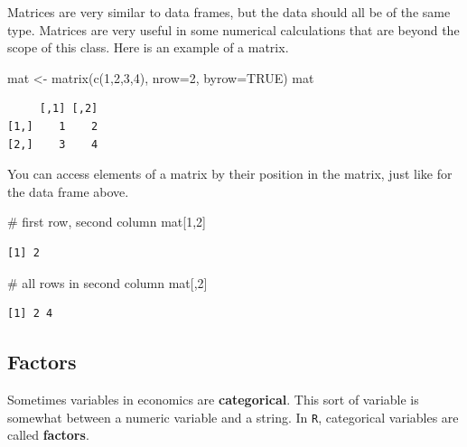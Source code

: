 \documentclass[
  letterpaper,
  DIV=11,
  numbers=noendperiod]{scrreprt}
\newenvironment{Shaded}{\begin{snugshade}}{\end{snugshade}}
\newcommand{\AttributeTok}[1]{\textcolor[rgb]{0.40,0.45,0.13}{#1}}
\newcommand{\CommentTok}[1]{\textcolor[rgb]{0.37,0.37,0.37}{#1}}
\newcommand{\ConstantTok}[1]{\textcolor[rgb]{0.56,0.35,0.01}{#1}}
\newcommand{\DecValTok}[1]{\textcolor[rgb]{0.68,0.00,0.00}{#1}}
\newcommand{\FunctionTok}[1]{\textcolor[rgb]{0.28,0.35,0.67}{#1}}
\newcommand{\NormalTok}[1]{\textcolor[rgb]{0.00,0.23,0.31}{#1}}
\newcommand{\OtherTok}[1]{\textcolor[rgb]{0.00,0.23,0.31}{#1}}
\begin{document}
Matrices are very similar to data frames, but the data should all be of
the same type. Matrices are very useful in some numerical calculations
that are beyond the scope of this class. Here is an example of a matrix.

\begin{Shaded}
\begin{Highlighting}[]
\NormalTok{mat }\OtherTok{\textless{}{-}} \FunctionTok{matrix}\NormalTok{(}\FunctionTok{c}\NormalTok{(}\DecValTok{1}\NormalTok{,}\DecValTok{2}\NormalTok{,}\DecValTok{3}\NormalTok{,}\DecValTok{4}\NormalTok{), }\AttributeTok{nrow=}\DecValTok{2}\NormalTok{, }\AttributeTok{byrow=}\ConstantTok{TRUE}\NormalTok{)}
\NormalTok{mat}
\end{Highlighting}
\end{Shaded}

\begin{verbatim}
     [,1] [,2]
[1,]    1    2
[2,]    3    4
\end{verbatim}

You can access elements of a matrix by their position in the matrix,
just like for the data frame above.

\begin{Shaded}
\begin{Highlighting}[]
\CommentTok{\# first row, second column}
\NormalTok{mat[}\DecValTok{1}\NormalTok{,}\DecValTok{2}\NormalTok{]}
\end{Highlighting}
\end{Shaded}

\begin{verbatim}
[1] 2
\end{verbatim}

\begin{Shaded}
\begin{Highlighting}[]
\CommentTok{\# all rows in second column}
\NormalTok{mat[,}\DecValTok{2}\NormalTok{] }
\end{Highlighting}
\end{Shaded}

\begin{verbatim}
[1] 2 4
\end{verbatim}

\subsection{Factors}\label{factors}

Sometimes variables in economics are \textbf{categorical}. This sort of
variable is somewhat between a numeric variable and a string. In
\texttt{R}, categorical variables are called \textbf{factors}.
\end{document}
